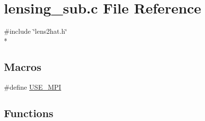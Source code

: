\section{lensing\-\_\-sub.\-c File Reference}
\label{rng_2common_2lensing__sub_8c}
{\ttfamily \#include \char`\"{}lens2hat.\-h\char`\"{}}\\*
\subsection*{Macros}
\begin{DoxyCompactItemize}
\item 
\#define \hyperlink{rng_2common_2lensing__sub_8c_a3869d282031f6ea6b50fdb980b758420}{U\-S\-E\-\_\-\-M\-P\-I}
\end{DoxyCompactItemize}
\subsection*{Functions}
